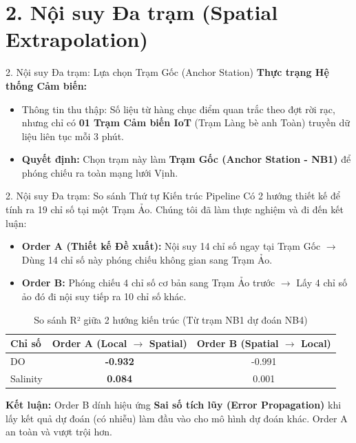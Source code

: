 \documentclass[aspectratio=169]{beamer}
\begin{document}
\section{2. Nội suy Đa trạm (Spatial Extrapolation)}

\begin{frame}{2. Nội suy Đa trạm: Lựa chọn Trạm Gốc (Anchor Station)}
    \textbf{Thực trạng Hệ thống Cảm biến:}
    \begin{itemize}
        \item Thông tin thu thập: Số liệu từ hàng chục điểm quan trắc theo đợt rời rạc, nhưng chỉ có \textbf{01 Trạm Cảm biến IoT} (Trạm Làng bè anh Toàn) truyền dữ liệu liên tục mỗi 3 phút.
        \item \textbf{Quyết định:} Chọn trạm này làm \textbf{Trạm Gốc (Anchor Station - NB1)} để phóng chiếu ra toàn mạng lưới Vịnh.
    \end{itemize}
\end{frame}


\begin{frame}{2. Nội suy Đa trạm: So sánh Thứ tự Kiến trúc Pipeline}
    Có 2 hướng thiết kế để tính ra 19 chỉ số tại một Trạm Ảo. Chúng tôi đã làm thực nghiệm và đi đến kết luận:
    
    \vspace{0.2cm}
    \begin{itemize}
        \item \textbf{Order A (Thiết kế Đề xuất):} Nội suy 14 chỉ số ngay tại Trạm Gốc $\rightarrow$ Dùng 14 chỉ số này phóng chiếu không gian sang Trạm Ảo.
        \item \textbf{Order B:} Phóng chiếu 4 chỉ số cơ bản sang Trạm Ảo trước $\rightarrow$ Lấy 4 chỉ số ảo đó đi nội suy tiếp ra 10 chỉ số khác.
    \end{itemize}
    
    \vspace{0.2cm}
    \begin{table}[]
        \centering
        \caption{So sánh R² giữa 2 hướng kiến trúc (Từ trạm NB1 dự đoán NB4)}
        \renewcommand{\arraystretch}{1.2}
        \begin{tabular}{lcc}
            \toprule
            \textbf{Chỉ số} & \textbf{Order A (Local $\to$ Spatial)} & \textbf{Order B (Spatial $\to$ Local)} \\
            \midrule
            DO & \textbf{-0.932} & -0.991 \\
            Salinity & \textbf{0.084} & 0.001 \\
            \bottomrule
        \end{tabular}
    \end{table}
    \textbf{Kết luận:} Order B dính hiệu ứng \textbf{Sai số tích lũy (Error Propagation)} khi lấy kết quả dự đoán (có nhiễu) làm đầu vào cho mô hình dự đoán khác. Order A an toàn và vượt trội hơn.
\end{frame}
\end{document}
